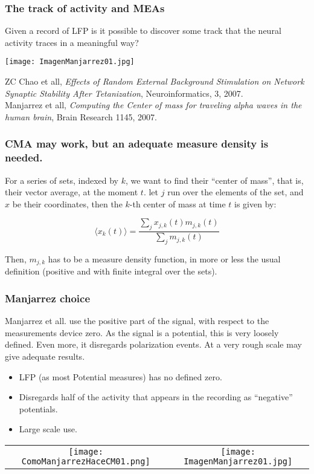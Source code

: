 \documentclass[10pt, serif]{beamer}
\begin{document}
\begin{frame}
    \frametitle{The track of activity and MEAs}
    Given a record of LFP is it possible to discover
    some track that the neural activity traces in a meaningful
    way?
    \begin{center}   
    \texttt{[image: ImagenManjarrez01.jpg]}
    \end{center}
    
    ZC Chao et all, \emph{Effects of Random External Background Stimulation
      on Network Synaptic Stability After Tetanization}, Neuroinformatics, 3, 2007.\\

    Manjarrez et all, \emph{Computing the Center of mass for traveling alpha waves in
  the human brain}, Brain Research 1145, 2007.   
  \end{frame}


   \begin{frame}
     \frametitle{CMA may work, but an adequate measure density is needed.}
     For a series of sets, indexed by $k$, we want to find their ``center of
     mass'', that is, their vector average, at the moment $t$. let $j$ run over
     the elements of the set, and $x$ be their coordinates, then the $k$-th
     center of mass at time $t$ is given by:
     
     \begin{equation}
       \langle x_k(t) \rangle =\frac{\sum_j x_{j,k} (t) m_{j,k} (t)} {\sum_j m_{j,k}(t)}
     \end{equation}

     Then, $m_{j,k}$ has to be a measure density function, in more or less the usual
     definition (positive and with finite integral over the sets).
   \end{frame}

   \begin{frame}
     \frametitle{Manjarrez choice}

     Manjarrez et all. use the positive part of the signal, with respect to
     the measurements device zero. As the signal is a potential, this
     is very loosely defined. Even more, it disregards polarization events.
     At a very rough scale may give adequate results.
          
     \begin{itemize}
       \item LFP (as most Potential measures) has no defined zero.
       \item Disregards half of the activity that appears in the recording as
         ``negative'' potentials.
       \item Large scale use.
     \end{itemize}

     \begin{tabular}{ c c }
      \texttt{[image: ComoManjarrezHaceCM01.png]} &
       \texttt{[image: ImagenManjarrez01.jpg]}
     \end{tabular}

    \end{frame}
\end{document}

